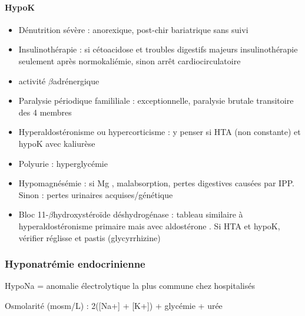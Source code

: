 \documentclass[11pt]{article}
\begin{document}
\paragraph{HypoK}
\label{sec:org2783515}
\begin{itemize}
\item Dénutrition sévère : anorexique, post-chir bariatrique sans suivi
\item Insulinothérapie : si cétoacidose et troubles digestifs majeurs \thus
insulinothérapie seulement après normokaliémie, sinon arrêt cardiocirculatoire \faBomb
\item \inc activité \(\beta\)adrénergique
\item Paralysie périodique famililiale : exceptionnelle, paralysie brutale
transitoire des 4 membres
\item Hyperaldostéronisme ou hypercorticisme : y penser si HTA (non constante) et hypoK avec
kaliurèse \inc
\item Polyurie : hyperglycémie \inc
\item Hypomagnésémie : si Mg \dec, malabsorption, pertes digestives causées par
IPP. Sinon : pertes urinaires acquises/génétique
\item Bloc 11-\(\beta\)hydroxystéroïde déshydrogénase : tableau similaire à
hyperaldostéronisme primaire mais avec aldostérone \dec. Si HTA et hypoK,
vérifier réglisse et pastis (glycyrrhizine)
\end{itemize}

\subsubsection{Hyponatrémie endocrinienne}
\label{sec:org94a070a}

HypoNa = anomalie électrolytique la plus commune chez hospitalisés

Osmolarité (mosm/L) : 2\texttimes{}([Na+] + [K+]) + glycémie + urée
\end{document}
